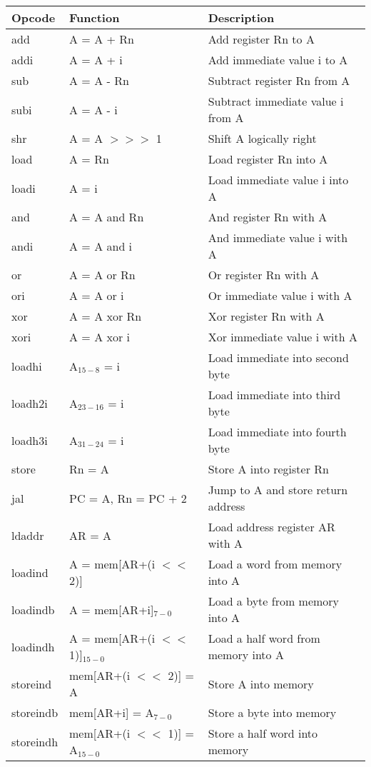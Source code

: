 \documentclass[%
    10pt,
    headinclude, footexclude,
    openright, %
    notitlepage,
    cleardoubleempty,
    headsepline,
    pointlessnumbers,
    bibtotoc, idxtotoc,
    ]{scrbook}
\begin{document}
\begin{table}
\centering
\begin{tabular}{lll}
\toprule
Opcode & Function & Description\\
\midrule
add & A = A + Rn & Add register Rn to A \\
addi & A = A + i & Add immediate value i to A \\
sub & A = A - Rn & Subtract register Rn from A \\
subi & A = A - i & Subtract immediate value i from A \\
shr & A = A $>>>$ 1 & Shift A logically right \\
load & A = Rn & Load register Rn into A \\
loadi & A = i & Load immediate value i into A \\
and & A = A and Rn & And register Rn with A \\
andi & A = A and i & And immediate value i with A \\
or & A = A or Rn & Or register Rn with A \\
ori & A = A or i & Or immediate value i with A \\
xor & A = A xor Rn & Xor register Rn with A \\
xori & A = A xor i & Xor immediate value i with A \\
loadhi & A$_{15-8}$ = i & Load immediate into second byte \\
loadh2i & A$_{23-16}$ = i  & Load immediate into third byte \\
loadh3i & A$_{31-24}$ = i & Load immediate into fourth byte \\
store & Rn = A & Store A into register Rn \\
jal & PC = A, Rn = PC + 2 & Jump to A and store return address\\%
ldaddr & AR = A & Load address register AR with A \\
loadind & A = mem[AR+(i $<<$ 2)] & Load a word from memory into A \\
loadindb & A = mem[AR+i]$_{7-0}$  &  Load a byte from memory into A\\
loadindh & A = mem[AR+(i $<<$ 1)]$_{15-0}$  &  Load a half word from memory into A\\
storeind & mem[AR+(i $<<$ 2)] = A & Store A into memory \\
storeindb & mem[AR+i] = A$_{7-0}$ & Store a byte into memory \\
storeindh & mem[AR+(i $<<$ 1)] = A$_{15-0}$ & Store a half word into memory \\

\end{tabular}
\end{table}
\end{document}
